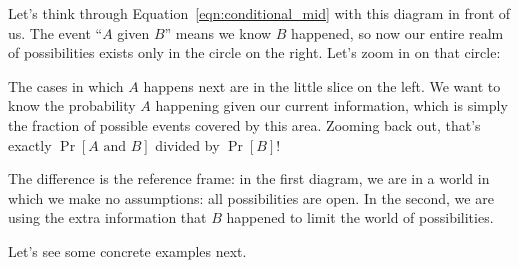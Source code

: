 Let's think through Equation~\ref{eqn:conditional_mid} with this diagram 
in front of us. The event ``$A$ given $B$'' means we know $B$ happened, 
so now our entire realm of possibilities exists only in the circle 
on the right. Let's zoom in on that circle:

\begin{center}
\end{center}

The cases in which $A$ happens next are in the little slice on the 
left. We want to know the probability $A$ happening given our current 
information, which is simply the fraction of possible events covered by 
this area. Zooming back out, that's exactly $\Pr[A \text{ and } B]$ 
divided by $\Pr[B]$!

The difference is the reference frame: in the first diagram, we are in a 
world in which we make no assumptions: all possibilities are open. In 
the second, we are using the extra information that $B$ happened to 
limit the world of possibilities. 

Let's see some concrete examples next.

